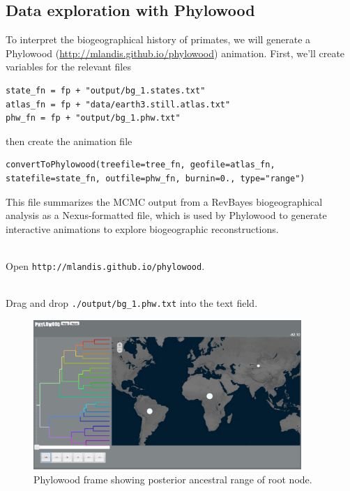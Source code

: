 \subsection{Data exploration with Phylowood}

To interpret the biogeographical history of primates, we will generate a Phylowood (\url{http://mlandis.github.io/phylowood}) animation.
First, we'll create variables for the relevant files

\begin{snugshade}
\begin{lstlisting}
state_fn = fp + "output/bg_1.states.txt"
atlas_fn = fp + "data/earth3.still.atlas.txt"
phw_fn = fp + "output/bg_1.phw.txt"
\end{lstlisting}
\end{snugshade}

then create the animation file

\begin{snugshade}
\begin{lstlisting}
convertToPhylowood(treefile=tree_fn, geofile=atlas_fn, statefile=state_fn, outfile=phw_fn, burnin=0., type="range")
\end{lstlisting}
\end{snugshade}

This file summarizes the MCMC output from a RevBayes biogeographical analysis as a Nexus-formatted file, which is used by Phylowood to generate interactive animations to explore biogeographic reconstructions.

\noindent \\ \impmark Open \texttt{http://mlandis.github.io/phylowood}.

\noindent \\ \impmark Drag and drop \texttt{./output/bg\_1.phw.txt} into the text field.

\begin{figure}[H]
\centering
\includegraphics[width=4in]{figures/bg_1_mrca}
\caption{Phylowood frame showing posterior ancestral range of root node.}
\end{figure}

